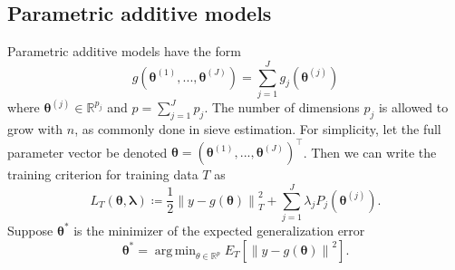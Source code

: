 \documentclass[12pt]{article} %
\theoremstyle{definition}
\DeclareMathOperator*{\argmin}{arg\,min}
\begin{document}
\subsection{Parametric additive models}
\label{sec:param_add_models}
Parametric additive models have the form
\begin{equation}
g(\boldsymbol{\theta}^{(1)}, ..., \boldsymbol{\theta}^{(J)}) = \sum_{j=1}^J g_j(\boldsymbol{\theta}^{(j)})
\end{equation}
where $\boldsymbol{\theta}^{(j)} \in \mathbb{R}^{p_j}$ and $p = \sum_{j=1}^J p_j$. The number of dimensions $p_j$ is allowed to grow with $n$, as commonly done in sieve estimation. For simplicity, let the full parameter vector be denoted $\boldsymbol{\theta} = \left (\boldsymbol{\theta}^{(1)}, ..., \boldsymbol{\theta}^{(J)} \right )^\top$. Then we can write the training criterion for training data $T$ as
\begin{equation}
\label{eq:param_add}
L_T \left (\boldsymbol{\theta}, \boldsymbol{\lambda} \right) 
\coloneqq \frac{1}{2} \left  \| y -  g(\boldsymbol{\theta}) \right \|^2_T 
+ \sum_{j=1}^J \lambda_j P_j(\boldsymbol{\theta}^{(j)}).
\end{equation}
Suppose $\boldsymbol{\theta}^*$ is the minimizer of the expected generalization error
\begin{equation}
\boldsymbol{\theta}^* = \argmin_{\theta \in \mathbb{R}^p} E_T \left [ \left \| y - g(\boldsymbol{\theta}) \right\|^2 \right ].
\end{equation}
\end{document}
